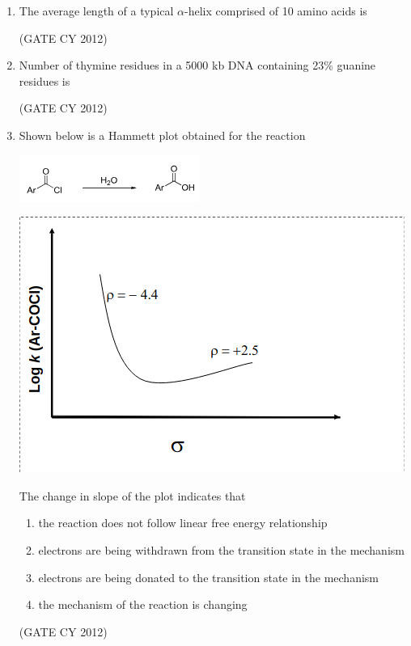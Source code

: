 \documentclass[12pt]{article}
\begin{document}
\begin{enumerate}
\item The average length of a typical $\alpha$-helix comprised of 10 amino acids is  
\begin{enumerate}
\end{enumerate}
\hfill (GATE CY 2012)

\item Number of thymine residues in a 5000 kb DNA containing 23\% guanine residues is  
\begin{enumerate}
\end{enumerate}
\hfill (GATE CY 2012)

\item Shown below is a Hammett plot obtained for the reaction

\includegraphics[width=0.45\columnwidth]{figs/q7a.png} 

\includegraphics[width=0.45\columnwidth]{figs/q7.png}  

The change in slope of the plot indicates that  
\begin{enumerate}
    \item the reaction does not follow linear free energy relationship
    \item electrons are being withdrawn from the transition state in the mechanism
    \item electrons are being donated to the transition state in the mechanism
    \item the mechanism of the reaction is changing
\end{enumerate}
\hfill (GATE CY 2012)


\end{enumerate}
\end{document}
